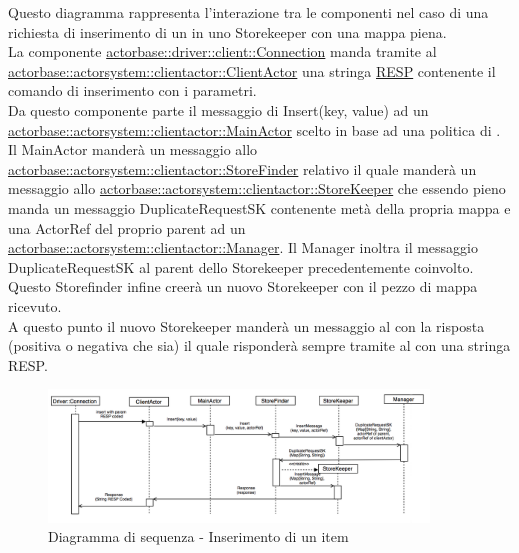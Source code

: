 \documentclass{scalatekids-article}
\begin{document}
Questo diagramma rappresenta l'interazione tra le componenti nel caso di una richiesta di inserimento di un  in uno Storekeeper con una mappa piena.\\
La componente \hyperref[sec:actorbase::driver::client::Connection]{actorbase::driver::client::Connection}
manda tramite  al \hyperref[sec:actorbase::actorsystem::clientactor::ClientActor]{actorbase::actorsystem::clientactor::ClientActor}
una stringa \hyperref[sec:RESP]{RESP} contenente il comando di inserimento  con
i parametri.\\
Da questo componente parte il messaggio di Insert(key, value) ad un \hyperref[sec:actorbase::actorsystem::clientactor::MainActor]{actorbase::actorsystem::clientactor::MainActor} scelto in base ad una
politica di . Il MainActor manderà un messaggio allo \hyperref[sec:actorbase::actorsystem::clientactor::StoreFinder]{actorbase::actorsystem::clientactor::StoreFinder} relativo il quale manderà un messaggio allo \hyperref[sec:actorbase::actorsystem::clientactor::StoreKeeper]{actorbase::actorsystem::clientactor::StoreKeeper} che essendo pieno manda un
messaggio DuplicateRequestSK contenente metà della propria mappa e una ActorRef del proprio parent ad un \hyperref[sec:actorbase::actorsystem::clientactor::Manager]{actorbase::actorsystem::clientactor::Manager}. Il Manager inoltra il messaggio DuplicateRequestSK al parent dello Storekeeper precedentemente coinvolto. Questo Storefinder infine creerà un nuovo Storekeeper con il pezzo di mappa ricevuto. \\
A questo punto il nuovo Storekeeper manderà un messaggio al  con
la risposta (positiva o negativa che sia) il quale risponderà sempre tramite
 al  con una stringa RESP.
\begin{figure}[H]
  \begin{center}
    \includegraphics[width=0.9\textwidth, keepaspectratio]{img/diagrammiSequenza/esempioInsertFull.png}
    \caption{Diagramma di sequenza - Inserimento di un item}
  \end{center}
\end{figure}
\end{document}
